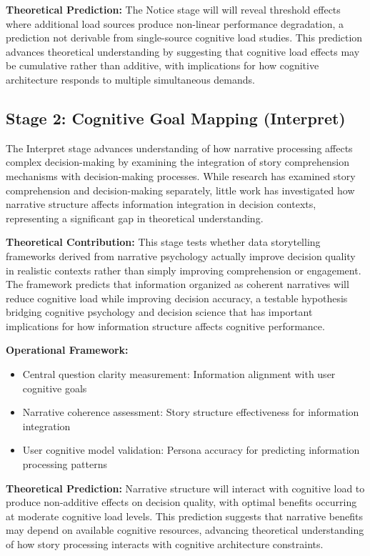 \documentclass[
  authoryear,
  preprint]{elsarticle}
\providecommand{\tightlist}{%
  \setlength{\itemsep}{0pt}\setlength{\parskip}{0pt}}
\begin{document}
\textbf{Theoretical Prediction:} The Notice stage will will reveal
threshold effects where additional load sources produce non-linear
performance degradation, a prediction not derivable from single-source
cognitive load studies. This prediction advances theoretical
understanding by suggesting that cognitive load effects may be
cumulative rather than additive, with implications for how cognitive
architecture responds to multiple simultaneous demands.

\subsection{Stage 2: Cognitive Goal Mapping
(Interpret)}\label{stage-2-cognitive-goal-mapping-interpret}

The Interpret stage advances understanding of how narrative processing
affects complex decision-making by examining the integration of story
comprehension mechanisms with decision-making processes. While research
has examined story comprehension and decision-making separately, little
work has investigated how narrative structure affects information
integration in decision contexts, representing a significant gap in
theoretical understanding.

\textbf{Theoretical Contribution:} This stage tests whether data
storytelling frameworks derived from narrative psychology actually
improve decision quality in realistic contexts rather than simply
improving comprehension or engagement. The framework predicts that
information organized as coherent narratives will reduce cognitive load
while improving decision accuracy, a testable hypothesis bridging
cognitive psychology and decision science that has important
implications for how information structure affects cognitive
performance.

\textbf{Operational Framework:}

\begin{itemize}
\tightlist
\item
  Central question clarity measurement: Information alignment with user
  cognitive goals
\item
  Narrative coherence assessment: Story structure effectiveness for
  information integration
\item
  User cognitive model validation: Persona accuracy for predicting
  information processing patterns
\end{itemize}

\textbf{Theoretical Prediction:} Narrative structure will interact with
cognitive load to produce non-additive effects on decision quality, with
optimal benefits occurring at moderate cognitive load levels. This
prediction suggests that narrative benefits may depend on available
cognitive resources, advancing theoretical understanding of how story
processing interacts with cognitive architecture constraints.
\end{document}
